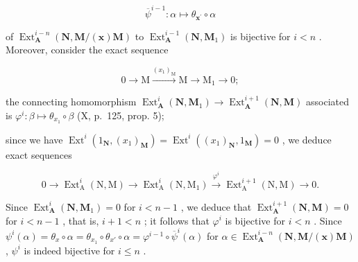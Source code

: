 \[
\overline {{{{\psi}}}} ^ {i - 1}: \alpha \mapsto \theta_ {\boldsymbol {x} ^ {\prime}} \circ \alpha
\]

of \(\operatorname{Ext}_{\mathbf{A}}^{i-n}(\mathbf{N}, \mathbf{M}/(\mathbf{x})\mathbf{M})\) to \(\operatorname{Ext}_{\mathbf{A}}^{i-1}(\mathbf{N}, \mathbf{M}_1)\) is bijective for \(i < n\) . Moreover, consider the exact sequence

\[
0 \longrightarrow \mathrm{M} \xrightarrow {(x _ {1}) _ {\mathrm{M}}} \mathrm{M} \longrightarrow \mathrm{M} _ {1} \longrightarrow 0;
\]

the connecting homomorphism \(\operatorname{Ext}_{\mathbf{A}}^{i}(\mathbf{N}, \mathbf{M}_{1}) \to \operatorname{Ext}_{\mathbf{A}}^{i+1}(\mathbf{N}, \mathbf{M})\) associated is \(\varphi^{i}: \beta \mapsto \theta_{x_{1}} \circ \beta\) (X, p.~125, prop. 5);

since we have \(\operatorname{Ext}^i(1_{\mathbf{N}}, (x_1)_{\mathbf{M}}) = \operatorname{Ext}^i((x_1)_{\mathbf{N}}, 1_{\mathbf{M}}) = 0\) , we deduce exact sequences

\[
0 \longrightarrow \operatorname{Ext} _ {\mathrm{A}} ^ {i} (\mathrm{N}, \mathrm{M}) \longrightarrow \operatorname{Ext} _ {\mathrm{A}} ^ {i} (\mathrm{N}, \mathrm{M} _ {1}) \xrightarrow {\varphi^ {i}} \operatorname{Ext} _ {\mathrm{A}} ^ {i + 1} (\mathrm{N}, \mathrm{M}) \longrightarrow 0.
\]

Since \(\operatorname{Ext}_{\mathbf{A}}^{i}(\mathbf{N}, \mathbf{M}_{1}) = 0\) for \(i < n - 1\) , we deduce that \(\operatorname{Ext}_{\mathbf{A}}^{i + 1}(\mathbf{N}, \mathbf{M}) = 0\) for \(i < n - 1\) , that is, \(i + 1 < n\) ; it follows that \(\varphi^{i}\) is bijective for \(i < n\) . Since \(\psi^{i}(\alpha) = \theta_{x} \circ \alpha = \theta_{x_{1}} \circ \theta_{x'} \circ \alpha = \varphi^{i - 1} \circ \overline{\psi}^{i}(\alpha)\) for \(\alpha \in \operatorname{Ext}_{\mathbf{A}}^{i - n}(\mathbf{N}, \mathbf{M}/(\mathbf{x})\mathbf{M})\) , \(\psi^{i}\) is indeed bijective for \(i \leqslant n\) .

\backmatter
